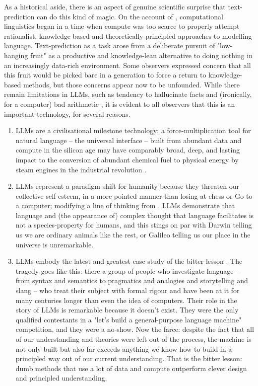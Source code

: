 As a historical aside, there is an aspect of genuine scientific surprise that text-prediction can do this kind of magic. On the account of \citep{mcshane_linguistics_2021}, computational linguistics began in a time when compute was too scarce to properly attempt rationalist, knowledge-based and theoretically-principled approaches to modelling language. Text-prediction as a task arose from a deliberate pursuit of "low-hanging fruit" as a productive and knowledge-lean alternative to doing nothing in an increasingly data-rich environment. Some observers \citep{church_pendulum_2011} expressed concern that all this fruit would be picked bare in a generation to force a return to knowledge-based methods, but those concerns appear now to be unfounded. While there remain limitations in LLMs, such as tendency to hallucinate facts and (ironically, for a computer) bad arithmetic \citep{hendrycks_measuring_2021}, it is evident to all observers that this is an important technology, for several reasons.\\

\begin{enumerate}
\item{
LLMs are a civilisational milestone technology; a force-multiplication tool for natural language -- the universal interface \citep{} -- built from abundant data and compute in the silicon age may have comparably broad, deep, and lasting impact to the conversion of abundant chemical fuel to physical energy by steam engines in the industrial revolution \citep{}.
}
\item{
LLMs represent a paradigm shift for humanity because they threaten our collective self-esteem, in a more pointed manner than losing at chess or Go to a computer; modifying a line of thinking from \citep{floridi_fourth_2014}, LLMs demonstrate that language and (the appearance of) complex thought that language facilitates is not a species-property for humans, and this stings on par with Darwin telling us we are ordinary animals like the rest, or Galileo telling us our place in the universe is unremarkable.
}
\item{
LLMs embody the latest and greatest case study of the bitter lesson \citep{sutton_bitter_2019}. The tragedy goes like this: there a group of people who investigate language -- from syntax and semantics to pragmatics and analogies and storytelling and slang -- who treat their subject with formal rigour and have been at it for many centuries longer than even the idea of computers. Their role in the story of LLMs is remarkable because it doesn't exist. They were the only qualified contestants in a "let's build a general-purpose language machine" competition, and they were a no-show. Now the farce: despite the fact that all of our understanding and theories were left out of the process, the machine is not only built but also far exceeds anything we know how to build in a principled way out of our current understanding. That is the bitter lesson: dumb methods that use a lot of data and compute outperform clever design and principled understanding.
}
\end{enumerate}


